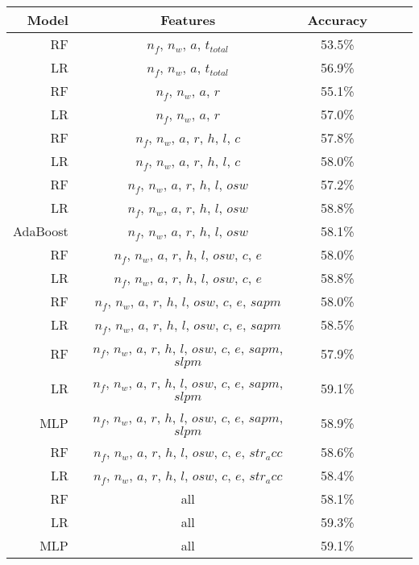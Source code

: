 \begin{center}
\begin{table}[h]
\begin{tabular}{r|ccccc}
\toprule
Model & Features & Accuracy\\
\hline
RF & $n_f$, $n_w$, $a$, $t_{total}$ & 53.5\% \\
LR & $n_f$, $n_w$, $a$, $t_{total}$ & 56.9\% \\
RF & $n_f$, $n_w$, $a$, $r$ & 55.1\% \\
LR & $n_f$, $n_w$, $a$, $r$ & 57.0\% \\
RF & $n_f$, $n_w$, $a$, $r$, $h$, $l$, $c$ & 57.8\% \\
LR & $n_f$, $n_w$, $a$, $r$, $h$, $l$, $c$ & 58.0\% \\

RF & $n_f$, $n_w$, $a$, $r$, $h$, $l$, $osw$ & 57.2\% \\
LR & $n_f$, $n_w$, $a$, $r$, $h$, $l$, $osw$ & 58.8\% \\
AdaBoost & $n_f$, $n_w$, $a$, $r$, $h$, $l$, $osw$ & 58.1\% \\

RF & $n_f$, $n_w$, $a$, $r$, $h$, $l$, $osw$, $c$, $e$ & 58.0\% \\
LR & $n_f$, $n_w$, $a$, $r$, $h$, $l$, $osw$, $c$, $e$ & 58.8\% \\

RF & $n_f$, $n_w$, $a$, $r$, $h$, $l$, $osw$, $c$, $e$, $sapm$ & 58.0\% \\
LR & $n_f$, $n_w$, $a$, $r$, $h$, $l$, $osw$, $c$, $e$, $sapm$ & 58.5\% \\

RF & $n_f$, $n_w$, $a$, $r$, $h$, $l$, $osw$, $c$, $e$, $sapm$, $slpm$ & 57.9\% \\
LR & $n_f$, $n_w$, $a$, $r$, $h$, $l$, $osw$, $c$, $e$, $sapm$, $slpm$ & 59.1\% \\
MLP & $n_f$, $n_w$, $a$, $r$, $h$, $l$, $osw$, $c$, $e$, $sapm$, $slpm$ & 58.9\% \\

RF & $n_f$, $n_w$, $a$, $r$, $h$, $l$, $osw$, $c$, $e$, $str_acc$ & 58.6\% \\
LR & $n_f$, $n_w$, $a$, $r$, $h$, $l$, $osw$, $c$, $e$, $str_acc$ & 58.4\% \\

RF & all & 58.1\% \\
LR & all & 59.3\% \\
MLP & all & 59.1\% \\


\end{tabular}
\end{table}
\end{center}
